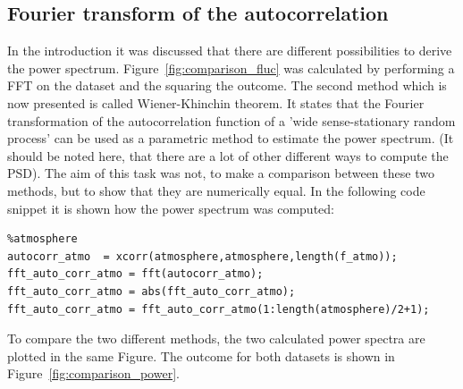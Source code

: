 \documentclass[12pt]{article}
\begin{document}
\subsection{Fourier transform of the autocorrelation}
In the introduction it was discussed that there are different possibilities to derive the power spectrum. Figure~\ref{fig:comparison_fluc} was calculated by performing a FFT on  the dataset and the squaring the outcome. The second method which is now presented is called Wiener-Khinchin theorem. It states that the Fourier transformation of the autocorrelation function of a 'wide sense-stationary random process' can be used as a parametric method to estimate the power spectrum. \cite{chatfield}(It should be noted here, that there are a lot of other different ways to compute the PSD). The aim of this task was not, to make a comparison between these two methods, but to show that they are numerically equal. In the following code snippet it is shown how the power spectrum was computed:
\begin{lstlisting}
%atmosphere
autocorr_atmo  = xcorr(atmosphere,atmosphere,length(f_atmo));
fft_auto_corr_atmo = fft(autocorr_atmo);
fft_auto_corr_atmo = abs(fft_auto_corr_atmo);
fft_auto_corr_atmo = fft_auto_corr_atmo(1:length(atmosphere)/2+1);
\end{lstlisting}
To compare the two different methods, the two calculated power spectra are plotted in the same Figure. The outcome for both datasets is shown in Figure~\ref{fig:comparison_power}.
\end{document}

